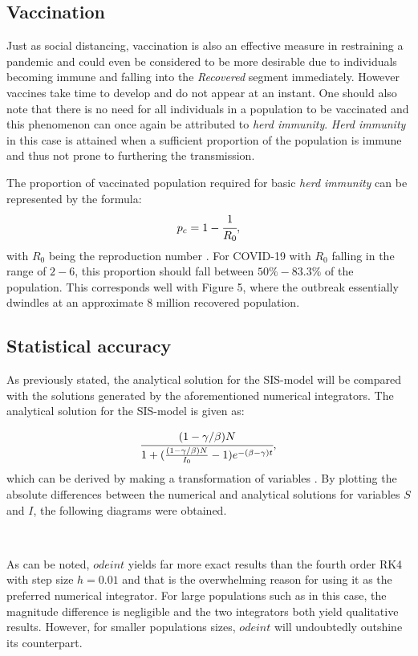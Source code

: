 \documentclass[12pt]{article}
\begin{document}
\subsection{Vaccination}
Just as social distancing, vaccination is also an effective measure in restraining a pandemic and could even be considered to be more desirable due to individuals becoming immune and falling into the \textit{Recovered} segment immediately. However vaccines take time to develop and do not appear at an instant. One should also note that there is no need for all individuals in a population to be vaccinated and this phenomenon can once again be attributed to \textit{herd immunity}. \textit{Herd immunity} in this case is attained when a sufficient proportion of the population is immune and thus not prone to furthering the transmission.

The proportion of vaccinated population required for basic \textit{herd immunity} can be represented by the formula: 
\begin{equation}
p_c = 1- \cfrac{1}{R_0},
\end{equation}
with $R_0$ being the reproduction number \cite{ashraf}. For COVID-19 with $R_0$ falling in the range of $2-6$, this proportion should fall between $50 \% - 83.3 \%$ of the population. This corresponds well with Figure 5, where the outbreak essentially dwindles at an approximate $8$ million recovered population. 
\newpage 
\subsection{Statistical accuracy}
As previously stated, the analytical solution for the SIS-model will be compared with the solutions generated by the aforementioned numerical integrators. The analytical solution for the SIS-model is given as:

\begin{equation}
\cfrac{(1-\gamma/\beta)N}{1+(\frac{(1-\gamma/\beta)N}{I_0}-1)
e^{-(\beta-\gamma)t}},  
\end{equation}
which can be derived by making a transformation of variables \cite{levin}.
By plotting the absolute differences between the numerical and analytical solutions for variables $S$ and $I$, the following diagrams were obtained.

\begin{figure*}[ht!]
\begin{center}
   \\
   \caption{\label{workflow} (a) Error margin for $odeint$ (b) Error margin for  RK4 - $h = 0.01$}
\end{center}
\end{figure*}
\noindent As can be noted, $odeint$ yields far more exact results than the fourth order RK4 with step size $h = 0.01$ and that is the overwhelming reason for using it as the preferred numerical integrator. For large populations such as in this case, the magnitude difference is negligible and the two integrators both yield qualitative results. However, for smaller populations sizes, $odeint$ will undoubtedly outshine its counterpart. 
\end{document}
